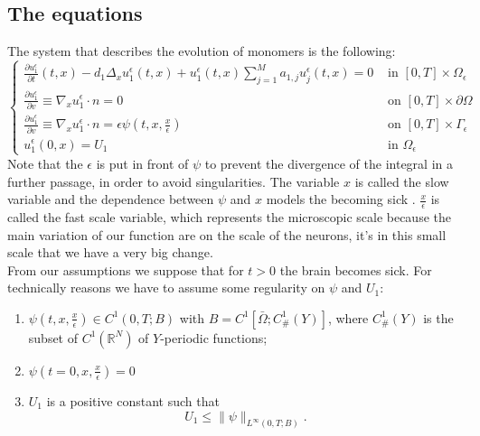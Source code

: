 \subsection{The equations}
The system that describes the evolution of monomers is the following:
\begin{equation}
    \begin{cases}
    \frac{\partial u_{1}^{\epsilon}}{\partial t}(t, x)-d_{1} \Delta_{x} u_{1}^{\epsilon}(t, x)+u_{1}^{\epsilon}(t, x) \sum_{j=1}^{M} a_{1, j} u_{j}^{\epsilon}(t, x)=0 & \text { in }[0, T] \times \Omega_{\epsilon}\\
    \frac{\partial u^{\epsilon}_1}{\partial v} \equiv \nabla_{x} u^{\epsilon}_1\cdot n=0 & \text { on }[0, T] \times \partial \Omega\\
    \frac{\partial u^{\epsilon}_{1}}{\partial v} \equiv \nabla_{x} u^{\epsilon}_1 \cdot n=\epsilon \psi\left(t, x, \frac{x}{\epsilon}\right) & \text { on }[0, T] \times \Gamma_{\epsilon}\\
    u_{1}^{\epsilon}(0, x)=U_{1} & \text{ in }\Omega_{\epsilon}
    \end{cases}
\label{eq 10.1}\end{equation}
Note that the $\epsilon$ is put in front of $\psi$ to prevent the divergence of the integral in a further passage, in order to avoid singularities. 
The variable $x$ is called the slow variable and the dependence between $\psi$ and $x$ models the becoming sick . 
$\frac{x}{\epsilon}$ is called the fast scale variable, which represents the microscopic scale because the main variation of our function are on the scale of the neurons, it's in this small scale that we have a very big change.\\
From our assumptions we suppose that for $t>0$ the brain becomes sick. For technically reasons we have to assume some regularity on $\psi$ and $U_1$:
\begin{enumerate}
    \item $\psi\left(t, x, \frac{x}{\epsilon}\right) \in C^{1}(0, T ; B)$ with $B=C^{1}\left[\bar{\Omega} ; C_{\text {\# }}^{1}(Y)\right]$, where $C_{\#}^{1}(Y)$ is the subset of $C^{1}\left(\mathbb{R}^{N}\right)$ of $Y$-periodic functions;
    \item $\psi\left(t=0, x, \frac{x}{\epsilon}\right)=0$
    \item 
$U_{1}$ is a positive constant such that
\begin{equation}
  U_{1} \leq\|\psi\|_{L^{\infty}(0, T ; B)} .
\label{eq 11}\end{equation}
\end{enumerate}

